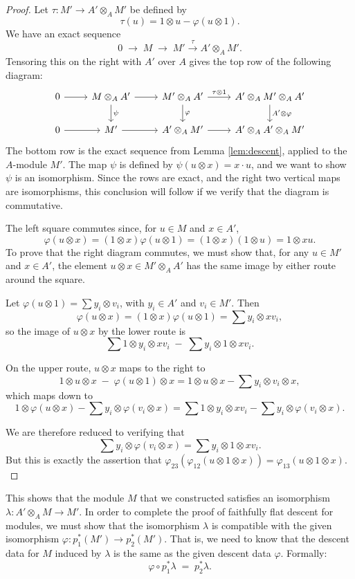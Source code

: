 \documentclass[12pt]{article}
\begin{document}
\begin{proof}
Let $\tau : M' \to A' \otimes_A M'$ be defined by 
\[
\tau(u) = 1 \otimes u - \varphi(u \otimes 1).
\]
We have an exact sequence
\[
0 \;\longrightarrow\; M \;\longrightarrow\; M' \xrightarrow{\;\tau\;} A' \otimes_A M'.
\]
Tensoring this on the right with $A'$ over $A$ gives the top row of the following diagram:
\[
\begin{tikzcd}
0 \arrow[r] 
& M \otimes_A A' \arrow[r] \arrow[d, "\psi"] 
& M' \otimes_A A' \arrow[r, "\tau \otimes 1"] \arrow[d, "\varphi"] 
& A' \otimes_A M' \otimes_A A' \arrow[d, "A' \otimes \varphi"] \\
0 \arrow[r] 
& M' \arrow[r] 
& A' \otimes_A M' \arrow[r] 
& A' \otimes_A A' \otimes_A M'
\end{tikzcd}
\]
The bottom row is the exact sequence from Lemma \ref{lem:descent}, applied to the $A$-module $M'$.  
The map $\psi$ is defined by $\psi(u \otimes x) = x \cdot u$, and we want to show $\psi$ is an isomorphism.  
Since the rows are exact, and the right two vertical maps are isomorphisms, this conclusion will follow if we verify that the diagram is commutative.

The left square commutes since, for $u \in M$ and $x \in A'$,  
\[
\varphi(u \otimes x) = (1 \otimes x)\varphi(u \otimes 1) = (1 \otimes x)(1 \otimes u) = 1 \otimes x u.
\]
To prove that the right diagram commutes, we must show that, for any $u \in M'$ and $x \in A'$, the element $u \otimes x \in M' \otimes_A A'$ has the same image by either route around the square.  

Let $\varphi(u \otimes 1) = \sum y_i \otimes v_i$, with $y_i \in A'$ and $v_i \in M'$. Then
\[
\varphi(u \otimes x) = (1 \otimes x)\varphi(u \otimes 1) = \sum y_i \otimes x v_i,
\]
so the image of $u \otimes x$ by the lower route is
\[
\sum 1 \otimes y_i \otimes x v_i \;-\; \sum y_i \otimes 1 \otimes x v_i.
\]

On the upper route, $u \otimes x$ maps to the right to 
\[
1 \otimes u \otimes x \;-\; \varphi(u \otimes 1) \otimes x 
= 1 \otimes u \otimes x - \sum y_i \otimes v_i \otimes x,
\]
which maps down to
\[
1 \otimes \varphi(u \otimes x) - \sum y_i \otimes \varphi(v_i \otimes x)
= \sum 1 \otimes y_i \otimes x v_i - \sum y_i \otimes \varphi(v_i \otimes x).
\]

We are therefore reduced to verifying that
\[
\sum y_i \otimes \varphi(v_i \otimes x) 
= \sum y_i \otimes 1 \otimes x v_i.
\]
But this is exactly the assertion that $ \varphi_{23}(\varphi_{12}(u \otimes 1 \otimes x)) = \varphi_{13}(u \otimes 1 \otimes x).$
\end{proof}
This shows that the module $M$ that we constructed satisfies an isomorphism $\lambda: A' \otimes_A M \to M'$. In order to complete the proof of faithfully flat descent for modules, we must show that the isomorphism $\lambda$ is compatible with the given isomorphism $\varphi: p_1^*(M') \to p_2^*(M')$. That is, we need to know that the descent data for $M$ induced by $\lambda$ is the same as the given descent data $\varphi$. Formally:
\[
\varphi \circ p_1^* \lambda \;=\; p_2^* \lambda.
\]
\end{document}
